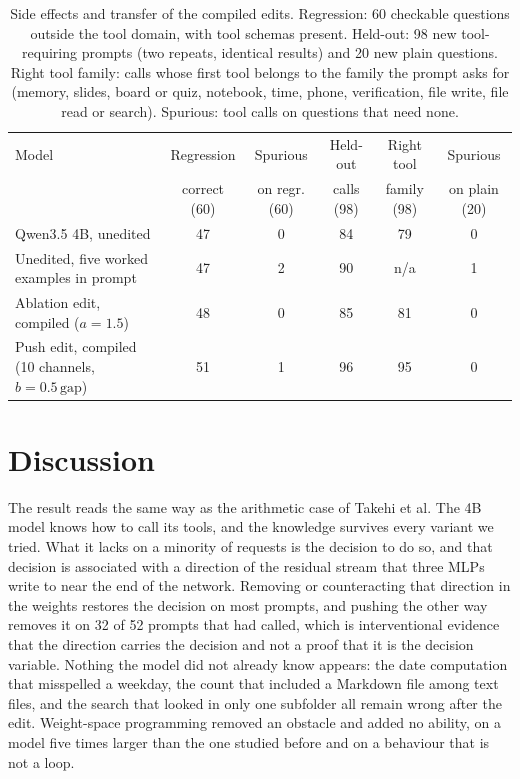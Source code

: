 \documentclass[11pt]{article}
\begin{document}
\begin{table}[t]
  \centering\small
  \caption{Side effects and transfer of the compiled edits. Regression: 60 checkable questions outside the tool domain, with tool schemas present. Held-out: 98 new tool-requiring prompts (two repeats, identical results) and 20 new plain questions. Right tool family: calls whose first tool belongs to the family the prompt asks for (memory, slides, board or quiz, notebook, time, phone, verification, file write, file read or search). Spurious: tool calls on questions that need none.}
  \label{tab:saglamlik}
  \setlength{\tabcolsep}{3pt}\footnotesize
  \begin{tabular}{lccccc}
    \toprule
    Model & Regression & Spurious & Held-out & Right tool & Spurious \\
          & correct (60) & on regr. (60) & calls (98) & family (98) & on plain (20) \\
    \midrule
    Qwen3.5 4B, unedited & 47 & 0 & 84 & 79 & 0 \\
    Unedited, five worked examples in prompt & 47 & 2 & 90 & n/a & 1 \\
    Ablation edit, compiled ($a=1.5$) & 48 & 0 & 85 & 81 & 0 \\
    Push edit, compiled (10 channels, $b=0.5\,\mathrm{gap}$) & 51 & 1 & 96 & 95 & 0 \\
    \bottomrule
  \end{tabular}
\end{table}

\section{Discussion}

The result reads the same way as the arithmetic case of Takehi et al. The 4B model knows how to call its tools, and the knowledge survives every variant we tried. What it lacks on a minority of requests is the decision to do so, and that decision is associated with a direction of the residual stream that three MLPs write to near the end of the network. Removing or counteracting that direction in the weights restores the decision on most prompts, and pushing the other way removes it on 32 of 52 prompts that had called, which is interventional evidence that the direction carries the decision and not a proof that it is the decision variable. Nothing the model did not already know appears: the date computation that misspelled a weekday, the count that included a Markdown file among text files, and the search that looked in only one subfolder all remain wrong after the edit. Weight-space programming removed an obstacle and added no ability, on a model five times larger than the one studied before and on a behaviour that is not a loop.
\end{document}
